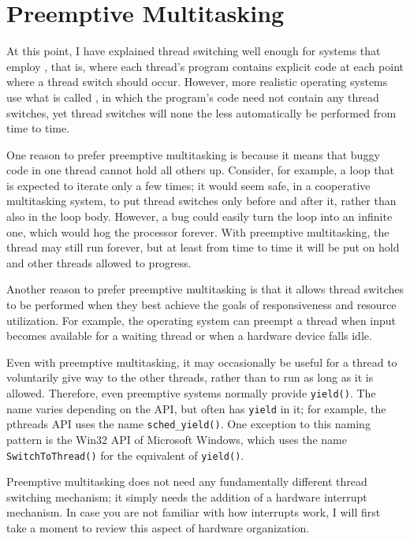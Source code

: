 \section{Preemptive Multitasking}\label{threads-preemptive-section}
At this point, I have explained thread switching well enough for
systems that employ , that is, where each
thread's program contains explicit code at each point where a thread
switch should occur.  However, more realistic operating systems use what
is called , in which the program's code
need not contain any thread switches, yet thread switches will none
the less automatically be performed from time to time.

One reason to prefer preemptive
multitasking is because it means that buggy code in one
thread cannot hold all others up.  Consider, for example, a loop that
is expected to iterate only a few times; it would seem safe, in a
cooperative multitasking system, to put thread switches only before
and after it, rather than also in the loop body.  However, a bug could
easily turn the loop into an infinite one, which would hog the
processor forever.  With preemptive multitasking, the thread may still
run forever, but at least from time to time it will be put on hold and
other threads allowed to progress.

Another reason to prefer preemptive multitasking is that it allows
thread switches to be performed when they best
achieve the goals of responsiveness and resource utilization.  For
example, the operating system can preempt a thread when input becomes
available for a waiting thread or when a hardware device falls idle.

Even with preemptive multitasking,
it may occasionally be useful for a thread to voluntarily give way to
the other threads, rather than to run as long as it is allowed.
Therefore, even preemptive systems normally provide
\verb|yield()|.
The name varies depending on the API, but often has \verb|yield| in it;
for example, the pthreads API uses the name \verb|sched_yield()|.  One
exception to this naming pattern is the Win32 API of Microsoft
Windows, which uses the name \verb|SwitchToThread()| for the equivalent
of \verb|yield()|.

Preemptive multitasking does not need any fundamentally different
thread switching mechanism; it simply needs the addition of a hardware
interrupt mechanism. In case you are not familiar with how interrupts
work, I will first take a moment to review this aspect of hardware
organization.

